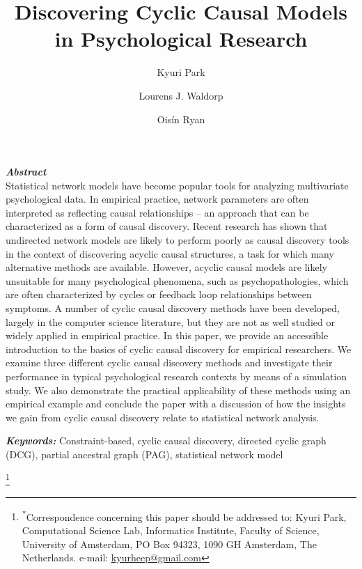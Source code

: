 \documentclass[twoside, 11pt]{article}
\title{Discovering Cyclic Causal Models in Psychological Research 
}
\author[1*]{Kyuri Park}
\author[2]{Lourens J. Waldorp}
\author[3]{Ois\'{i}n Ryan}
\affil[1]{Computational Science Lab, Informatics Institute, University of Amsterdam}%
\affil[2]{Department of Psychology, University of Amsterdam}%
\affil[3]{Department of Data Science and Biostatistics, Julius Centre, University Medical Centre Utrecht}%
\date{ }
\newcommand\blfootnote[1]{%
  \begingroup
  \renewcommand\thefootnote{}\footnote{#1}%
  \addtocounter{footnote}{-1}%
  \endgroup
}
\begin{document}
\maketitle
\thispagestyle{firstpage}

\begin{adjustwidth}{1.5cm}{1.5cm}

\noindent \textbf{\textit{Abstract }} \\
\noindent Statistical network models have become popular tools for analyzing multivariate psychological data. In empirical practice, network parameters are often interpreted as reflecting causal relationships – an approach that can be characterized as a form of causal discovery. Recent research has shown that undirected network models are likely to perform poorly as causal discovery tools in the context of discovering acyclic causal structures, a task for which many alternative methods are available. However, acyclic causal models are likely unsuitable for many psychological phenomena, such as psychopathologies, which are often characterized by cycles or feedback loop relationships between symptoms. A number of cyclic causal discovery methods have been developed, largely in the computer science literature, but they are not as well studied or widely applied in empirical practice. In this paper, we provide an accessible introduction to the basics of cyclic causal discovery for empirical researchers. We examine three different cyclic causal discovery methods and investigate their performance in typical psychological research contexts by means of a simulation study. We also demonstrate the practical applicability of these methods using an empirical example and conclude the paper with a discussion of how the insights we gain from cyclic causal discovery relate to statistical network analysis.


\vspace{1.5mm}
\noindent\textbf{{\textit{Keywords: }}}%
Constraint-based, cyclic causal discovery, directed cyclic graph (DCG), partial ancestral graph (PAG), statistical network model\\


\end{adjustwidth}

\blfootnote{\textsuperscript{\scriptsize{*}}Correspondence concerning this paper should be addressed to: Kyuri Park, Computational Science Lab, Informatics Institute, Faculty of Science, University of Amsterdam, PO Box 94323, 1090 GH Amsterdam, The Netherlands. e-mail: \href{mailto:kyurheep@gmail.com}{kyurheep@gmail.com}} 
\end{document}
